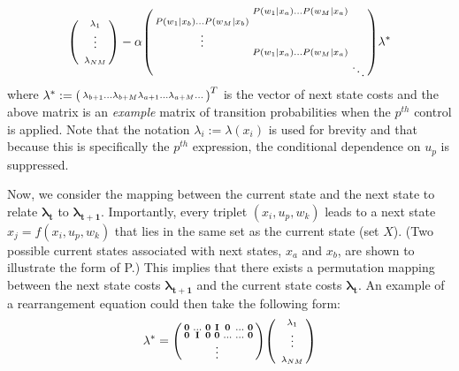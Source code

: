 \documentclass[conference]{IEEEtran}
\begin{document}
\begin{gather}\label{eq:mtxLPineq}
\begin{psmallmatrix}
& \lambda_{1}\\
& \vdots\\
& \\
& \lambda_{NM}
\end{psmallmatrix}
-
\alpha
\begin{psmallmatrix}
& P(w_{1}|x_{a}) \hdots  P(w_{M}|x_{a})  \\
P(w_{1}|x_{b}) \hdots  P(w_{M}|x_{b}) \\
\vdots\\
& P(w_{1}|x_{a}) \hdots  P(w_{M}|x_{a})  \\
& & \ddots
\end{psmallmatrix}
\lambda^{*}\end{gather} where $\lambda^{*} := \begin{psmallmatrix}
\lambda_{b+1} \hdots \lambda_{b+M} \lambda_{a+1}\hdots \lambda_{a+M} \hdots \end{psmallmatrix}^{T}$ is the vector of next state costs and the above matrix is an \textit{example} matrix of transition probabilities when the $p^{th}$ control is applied. Note that the notation $\lambda_{i}:=\lambda(x_{i})$ is used for brevity and that because this is specifically the $p^{th}$ expression, the conditional dependence on $u_{p}$ is suppressed.

Now, we consider the mapping between the current state and the next state to relate $\boldsymbol{\lambda_{t}}$ to $\boldsymbol{\lambda_{t+1}}$. Importantly, every triplet $(x_{i},u_{p},w_{k})$ leads to a next state $x_{j}=f(x_{i},u_{p},w_{k})$ that lies in the same set as the current state (set $X$). (Two possible current states associated with next states, $x_{a}$ and $x_{b}$, are shown to illustrate the form of P.) This implies that there exists a permutation mapping between the next state costs $\boldsymbol{\lambda_{t+1}}$ and the current state costs $\boldsymbol{\lambda_{t}}$. An example of a rearrangement equation could then take the following form:
\begin{gather} \label{eq:permMtx}
\lambda^{*}
=
\begin{psmallmatrix}
    \bold{0} & \hdots & \bold{0} & \bold{I} & \bold{0} & \hdots & \bold{0} \\
    \bold{0} & \bold{I} & \bold{0} & \bold{0} & \hdots & \hdots & \bold{0} \\
    & & & \vdots\\
\end{psmallmatrix}
\begin{psmallmatrix}
    & \lambda_{1}\\
    & \vdots\\
    & \\
    & \lambda_{NM}
\end{psmallmatrix}
\end{gather}
\end{document}
